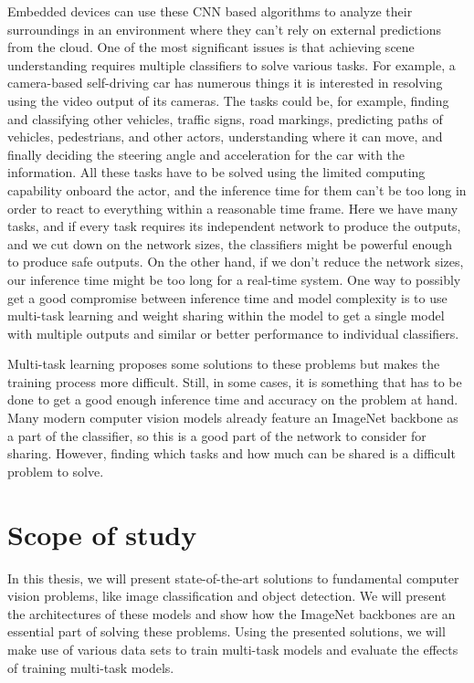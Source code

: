 Embedded devices can use these CNN based algorithms to analyze their surroundings in an environment where they can't rely on external predictions from the cloud. One of the most significant issues is that achieving scene understanding requires multiple classifiers to solve various tasks. For example, a camera-based self-driving car has numerous things it is interested in resolving using the video output of its cameras. The tasks could be, for example, finding and classifying other vehicles, traffic signs, road markings, predicting paths of vehicles, pedestrians, and other actors, understanding where it can move, and finally deciding the steering angle and acceleration for the car with the information. All these tasks have to be solved using the limited computing capability onboard the actor, and the inference time for them can't be too long in order to react to everything within a reasonable time frame. Here we have many tasks, and if every task requires its independent network to produce the outputs, and we cut down on the network sizes, the classifiers might be powerful enough to produce safe outputs. On the other hand, if we don't reduce the network sizes, our inference time might be too long for a real-time system. One way to possibly get a good compromise between inference time and model complexity is to use multi-task learning and weight sharing within the model to get a single model with multiple outputs and similar or better performance to individual classifiers.

Multi-task learning proposes some solutions to these problems but makes the training process more difficult. Still, in some cases, it is something that has to be done to get a good enough inference time and accuracy on the problem at hand. Many modern computer vision models already feature an ImageNet backbone as a part of the classifier, so this is a good part of the network to consider for sharing. 
However, finding which tasks and how much can be shared is a difficult problem to solve.

\section{Scope of study}
In this thesis, we will present state-of-the-art solutions to fundamental computer vision problems, like image classification and object detection.
We will present the architectures of these models and show how the ImageNet backbones are an essential part of solving these problems.
Using the presented solutions, we will make use of various data sets to train multi-task models and evaluate the effects of training multi-task models.

